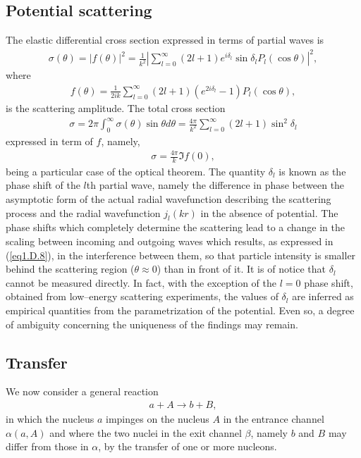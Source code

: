 \begin{subappendices}
\subsection{Potential scattering}
The elastic differential cross section expressed in terms of partial waves is
\begin{align}\label{eq1.D.5}
\sigma(\theta)=|f(\theta)|^2=\frac{1}{k^2}\left|\sum_{l=0}^\infty(2l+1)e^{i\delta_l}\sin\delta_lP_l(\cos\theta)\right|^2,
\end{align}
where
\begin{align}\label{eq1.D.6}
f(\theta)=\frac{1}{2ik}\sum_{l=0}^\infty(2l+1)\left(e^{2i\delta_l}-1\right) P_l(\cos\theta),
\end{align}
is the scattering amplitude. The total cross section 
\begin{align}\label{eq1.D.7}
\sigma=2\pi\int_0^\infty\sigma(\theta)\sin\theta d\theta=\frac{4\pi}{k^2}\sum_{l=0}^\infty(2l+1)\sin^2\delta_l
\end{align}
expressed in term of $f$, namely,
\begin{align}\label{eq1.D.8}
\sigma=\frac{4\pi}{k}\Im f(0),
\end{align}
being a particular case of the optical theorem. The quantity $\delta_l$ is known as the phase shift of the $l$th partial wave, namely the difference in phase between the asymptotic form of the actual radial wavefunction describing the scattering process and the radial wavefunction $j_l(kr)$ in the absence of potential. The phase shifts which completely determine the scattering lead to a change in the scaling between incoming and outgoing waves which results, as expressed in (\ref{eq1.D.8}), in the interference between them, so that particle intensity is smaller behind the scattering region ($\theta\approx0$) than in front of it. It is of notice that $\delta_l$ cannot be measured directly. In fact, with the exception of the $l=0$ phase shift, obtained from low--energy scattering experiments, the values of $\delta_l$ are inferred as empirical quantities from the parametrization of the potential. Even so, a degree of ambiguity concerning the uniqueness of the findings may remain.
\subsection{Transfer}
We now consider a general reaction
\begin{align}\label{eq1.D.9}
a+A\rightarrow b+B,
\end{align}
in which the nucleus $a$ impinges on the nucleus $A$ in the entrance channel $\alpha(a,A)$ and where the two nuclei in the exit channel $\beta$, namely $b$ and $B$ may differ from those in $\alpha$, by the transfer of one or more nucleons.





\end{subappendices}
